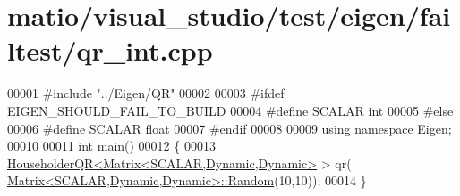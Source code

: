 \hypertarget{matio_2visual__studio_2test_2eigen_2failtest_2qr__int_8cpp_source}{}\section{matio/visual\+\_\+studio/test/eigen/failtest/qr\+\_\+int.cpp}
\label{matio_2visual__studio_2test_2eigen_2failtest_2qr__int_8cpp_source}

\begin{DoxyCode}
00001 \textcolor{preprocessor}{#include "../Eigen/QR"}
00002 
00003 \textcolor{preprocessor}{#ifdef EIGEN\_SHOULD\_FAIL\_TO\_BUILD}
00004 \textcolor{preprocessor}{#define SCALAR int}
00005 \textcolor{preprocessor}{#else}
00006 \textcolor{preprocessor}{#define SCALAR float}
00007 \textcolor{preprocessor}{#endif}
00008 
00009 \textcolor{keyword}{using namespace }\hyperlink{namespace_eigen}{Eigen};
00010 
00011 \textcolor{keywordtype}{int} main()
00012 \{
00013   \hyperlink{group___q_r___module_class_eigen_1_1_householder_q_r}{HouseholderQR<Matrix<SCALAR,Dynamic,Dynamic>} > qr(
      \hyperlink{group___core___module_class_eigen_1_1_matrix}{Matrix<SCALAR,Dynamic,Dynamic>::Random}(10,10));
00014 \}
\end{DoxyCode}

